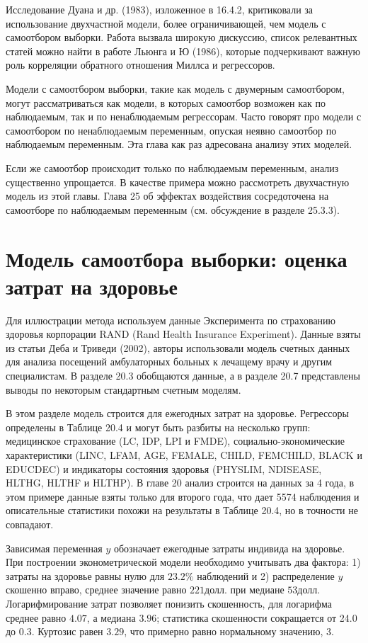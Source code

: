Исследование Дуана и др. (1983), изложенное в 16.4.2, критиковали за использование двухчастной модели, более ограничивающей, чем модель с самоотбором выборки. Работа вызвала широкую дискуссию, список релевантных статей можно найти в работе Льюнга и Ю (1986), которые подчеркивают важную роль корреляции обратного отношения Миллса и регрессоров.

Модели с самоотбором выборки, такие как модель с двумерным самоотбором, могут рассматриваться как модели, в которых самоотбор возможен как по наблюдаемым, так и по ненаблюдаемым регрессорам. Часто говорят про модели с самоотбором по ненаблюдаемым переменным, опуская неявно самоотбор по наблюдаемым переменным. Эта глава как раз адресована анализу этих моделей.

Если же самоотбор происходит только по наблюдаемым переменным, анализ существенно упрощается. В качестве примера можно рассмотреть двухчастную модель из этой главы. Глава 25 об эффектах воздействия сосредоточена на самоотборе по наблюдаемым переменным (см. обсуждение в разделе 25.3.3). 

\section{Модель самоотбора выборки: оценка затрат на здоровье}

Для иллюстрации метода используем данные Эксперимента по страхованию здоровья корпорации RAND (Rand Health Insurance Experiment). Данные взяты из статьи Деба и Триведи (2002), авторы использовали модель счетных данных для анализа посещений амбулаторных больных к лечащему врачу и другим специалистам. В разделе 20.3 обобщаются данные, а в разделе 20.7 представлены выводы по некоторым стандартным счетным моделям.


В этом разделе модель строится для ежегодных затрат на здоровье. Регрессоры определены в Таблице 20.4 и могут быть разбиты на несколько групп: медицинское страхование (LC, IDP, LPI и FMDE), социально-экономические характеристики (LINC, LFAM, AGE, FEMALE, CHILD, FEMCHILD, BLACK и EDUCDEC) и индикаторы состояния здоровья (PHYSLIM, NDISEASE, HLTHG, HLTHF и HLTHP). В главе 20 анализ строится на данных за 4 года, в этом примере данные взяты только для второго года, что дает 5574 наблюдения и описательные статистики похожи на результаты в Таблице 20.4, но в точности не совпадают.

Зависимая переменная $y$ обозначает ежегодные затраты индивида на здоровье. При построении эконометрической модели необходимо учитывать два фактора: 1) затраты на здоровье равны нулю для $23.2\%$ наблюдений и 2) распределение $y$ скошенно вправо, среднее значение равно $221 $долл. при медиане $53 $долл. Логарифмирование затрат позволяет понизить скошенность, для логарифма  среднее равно $4.07$, а медиана $3.96$; статистика скошенности сокращается от 24.0 до 0.3. Куртозис равен $3.29$, что примерно равно нормальному значению, $3$. 

